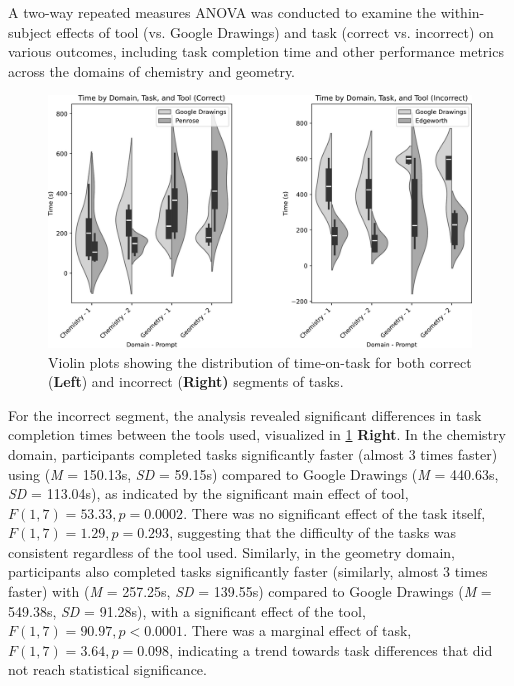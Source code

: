 A two-way repeated measures ANOVA was conducted to examine the within-subject effects of tool (\Edgeworth vs. Google Drawings) and task (correct vs. incorrect) on various outcomes, including task completion time and other performance metrics across the domains of chemistry and geometry.

\begin{figure}[h]
    \centering
    \includegraphics[width=\linewidth]{assets/edgeworth-eval/timing-violin.pdf}
    \caption{Violin plots showing the distribution of time-on-task for both correct (\textbf{Left}) and incorrect (\textbf{Right)} segments of tasks.}
    \label{fig:timing-violin}
\end{figure}


For the incorrect segment, the analysis revealed significant differences in task completion times between the tools used, visualized in \cref{fig:timing-violin} \textbf{Right}. In the chemistry domain, participants completed tasks significantly faster (almost 3 times faster) using \Edgeworth (\textit{M} = 150.13s, \textit{SD} = 59.15s) compared to Google Drawings (\textit{M} = 440.63s, \textit{SD} = 113.04s), as indicated by the significant main effect of tool, $F(1, 7) = 53.33, p = 0.0002$. There was no significant effect of the task itself, $F(1, 7) = 1.29, p = 0.293$, suggesting that the difficulty of the tasks was consistent regardless of the tool used. Similarly, in the geometry domain, participants also completed tasks significantly faster (similarly, almost 3 times faster) with \Edgeworth (\textit{M} = 257.25s, \textit{SD} = 139.55s) compared to Google Drawings (\textit{M} = 549.38s, \textit{SD} = 91.28s), with a significant effect of the tool, $F(1, 7) = 90.97, p < 0.0001$. There was a marginal effect of task, $F(1, 7) = 3.64, p = 0.098$, indicating a trend towards task differences that did not reach statistical significance. 

